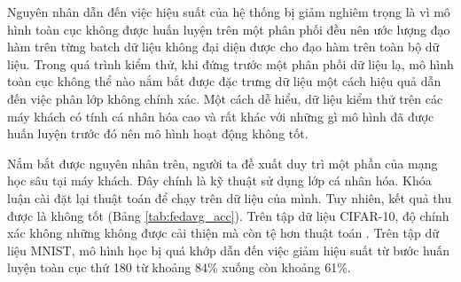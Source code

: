 Nguyên nhân dẫn đến việc hiệu suất của hệ thống bị giảm nghiêm trọng là vì mô hình toàn cục không được huấn luyện trên một phân phối đều nên ước lượng đạo hàm trên từng batch dữ liệu không đại diện được cho đạo hàm trên toàn bộ dữ liệu. Trong quá trình kiểm thử, khi đứng trước một phân phối dữ liệu lạ, mô hình toàn cục không thể nào nắm bắt được đặc trưng dữ liệu một cách hiệu quả dẫn đến việc phân lớp không chính xác. Một cách dễ hiểu, dữ liệu kiểm thử trên các máy khách có tính cá nhân hóa cao và rất khác với những gì mô hình đã được huấn luyện trước đó nên mô hình hoạt động không tốt.

Nắm bắt được nguyên nhân trên, người ta đề xuất duy trì một phần của mạng học sâu tại máy khách. Đây chính là kỹ thuật sử dụng lớp cá nhân hóa. Khóa luận cài đặt lại thuật toán  để chạy trên dữ liệu của mình. Tuy nhiên, kết quả thu được là không tốt (Bảng \ref{tab:fedavg_acc}). Trên tập dữ liệu CIFAR-10, độ chính xác không những không được cải thiện mà còn tệ hơn thuật toán . Trên tập dữ liệu MNIST, mô hình học bị quá khớp dẫn đến việc giảm hiệu suất từ bước huấn luyện toàn cục thứ 180 từ khoảng 84\% xuống còn khoảng 61\%.

\begin{table}[H]
    \centering
    \caption{Bảng độ chính xác (\%) của thuật toán FedAvg, FedAvgMeta, FedPer tính trên điểm dữ liệu (dữ liệu IID và Non-IID)}
    \label{tab:fedavg_acc}
\end{table}

